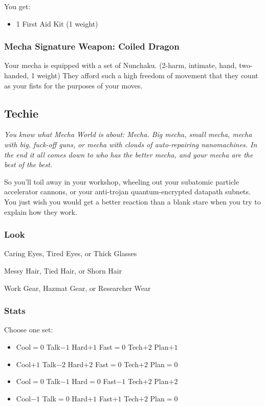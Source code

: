 You get:
\begin{itemize}
\item 1 First Aid Kit (1 weight)
\end{itemize}

\subsubsection{Mecha Signature Weapon: Coiled Dragon}
Your mecha is equipped with a set of Nunchaku. (2-harm, intimate, hand, two-handed, 1 weight) They afford such a high freedom of movement that they count as your fists for the purposes of your moves.




\subsection{Techie}
{\itshape You know what Mecha World is about: Mecha. Big mecha, small
  mecha, mecha with big, fuck-off guns, or mecha with clouds of
  auto-repairing nanomachines. In the end it all comes down to who has
  the better mecha, and your mecha are the best of the best.

So you'll toil away in your workshop, wheeling out your subatomic
particle accelerator cannons, or your anti-trojan quantum-encrypted
datapath subnets. You just wish you would get a better reaction than a
blank stare when you try to explain how they work.}

\subsubsection{Look}

Caring Eyes, Tired Eyes, or Thick Glasses

Messy Hair, Tied Hair, or Shorn Hair

Work Gear, Hazmat Gear, or Researcher Wear

\subsubsection{Stats}
Choose one set:
\begin{itemize}
\setlength\itemsep{0em}
\item Cool${=}0$ Talk$-1$ Hard$+1$ Fast${=}0$ Tech$+2$ Plan$+1$
\item Cool$+1$ Talk$-2$ Hard$+2$ Fast${=}0$ Tech$+2$ Plan${=}0$
\item Cool${=}0$ Talk$-1$ Hard${=}0$ Fast$-1$ Tech$+2$ Plan$+2$
\item Cool$-1$ Talk${=}0$ Hard$+1$ Fast$+1$ Tech$+2$ Plan${=}0$
\end{itemize}

